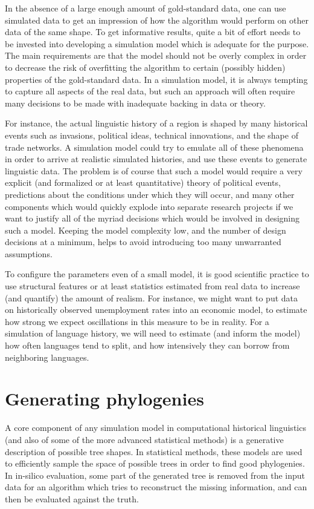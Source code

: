 In the absence of a large enough amount of gold-standard data, one can use simulated data to get an impression of how the algorithm would perform on other data of the same shape. To get informative results, quite a bit of effort needs to be invested into developing a simulation model which is adequate for the purpose. The main requirements are that the model should not be overly complex in order to decrease the risk of overfitting the algorithm to certain (possibly hidden) properties of the gold-standard data. In a simulation model, it is always tempting to capture all aspects of the real data, but such an approach will often require many decisions to be made with inadequate backing in data or theory.

For instance, the actual linguistic history of a region is shaped by many historical events such as invasions, political ideas, technical innovations, and the shape of trade networks. A simulation model could try to emulate all of these phenomena in order to arrive at realistic simulated histories, and use these events to generate linguistic data. The problem is of course that such a model would require a very explicit (and formalized or at least quantitative) theory of political events, predictions about the conditions under which they will occur, and many other components which would quickly explode into separate research projects if we want to justify all of the myriad decisions which would be involved in designing such a model. Keeping the model complexity low, and the number of design decisions at a minimum, helps to avoid introducing too many unwarranted assumptions.

To configure the parameters even of a small model, it is good scientific practice to use structural features or at least statistics estimated from real data to increase (and quantify) the amount of realism. For instance, we might want to put data on historically observed unemployment rates into an economic model, to estimate how strong we expect oscillations in this measure to be in reality. For a simulation of language history, we will need to estimate (and inform the model) how often languages tend to split, and how intensively they can borrow from neighboring languages.

\largerpage
\section{Generating phylogenies}
A core component of any simulation model in computational historical linguistics (and also of some of the more advanced statistical methods) is a generative description of possible tree shapes. In statistical methods, these models are used to efficiently sample the space of possible trees in order to find good phylogenies. In in-silico evaluation, some part of the generated tree is removed from the input data for an algorithm which tries to reconstruct the missing information, and can then be evaluated against the truth.

